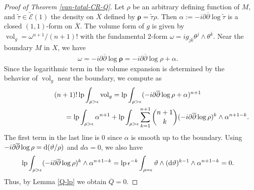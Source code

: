\documentclass[10pt,a4paper]{amsart}
\numberwithin{equation}{section}
\begin{document}
\begin{proof}[Proof of Theorem \ref{van-total-CR-Q}] Let $\rho$ be an arbitrary def\/ining function of $M$, and $\widetilde\tau\in\widetilde{\mathcal{E}} (1)$ the density on $\overline X$ def\/ined by $\boldsymbol\rho=\widetilde\tau\rho$. Then $\alpha:=-i\partial\overline{\partial}\log\widetilde\tau$ is a closed $(1,1)$-form on $\overline X$. The volume form of $g$ is given by $\operatorname{vol}_g=\omega^{n+1}/(n+1)!$ with the fundamental 2-form $\omega=ig_{j\overline k}\theta^j\wedge\theta^{\overline k}$. Near the boundary $M$ in $X$, we have
\begin{gather*}
\omega=-i\partial\overline{\partial}\log\boldsymbol\rho=-i\partial\overline{\partial}\log\rho+\alpha.
\end{gather*}
Since the logarithmic term in the volume expansion is determined by the behavior of $\operatorname{vol}_g$ near the boundary, we compute as
\begin{gather*}
(n+1)! \operatorname{lp}\int_{\rho>\epsilon} \operatorname{vol}_g
 = \operatorname{lp}\int_{\rho>\epsilon} (-i\partial\overline{\partial}\log\rho+\alpha)^{n+1} \\
\hphantom{(n+1)! \operatorname{lp}\int_{\rho>\epsilon} \operatorname{vol}_g}{} =\operatorname{lp}\int_{\rho>\epsilon} \alpha^{n+1}+
\operatorname{lp}\int_{\rho>\epsilon} \sum_{k=1}^{n+1} \binom{n+1}{k} (-i\partial\overline{\partial}\log\rho)^{k}\wedge\alpha^{n+1-k}.
\end{gather*}
The f\/irst term in the last line is 0 since $\alpha$ is smooth up to the boundary. Using $-i\partial\overline{\partial}\log\rho={\rm d}(\vartheta/\rho)$ and $d\alpha=0$, we also have
\begin{gather*}
\operatorname{lp}\int_{\rho>\epsilon} (-i\partial\overline{\partial}\log\rho)^{k}\wedge\alpha^{n+1-k}=\operatorname{lp} \epsilon^{-k}\int_{\rho=\epsilon} \vartheta\wedge({\rm d}\vartheta)^{k-1}\wedge \alpha^{n+1-k} =0.
\end{gather*}
Thus, by Lemma \ref{Q-lp} we obtain $\overline Q=0$.
\end{proof}
\end{document}
